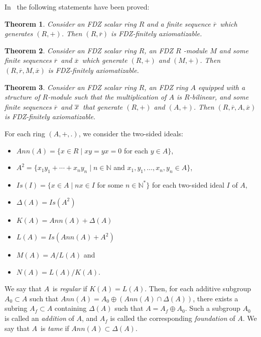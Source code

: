 \documentclass{article}
\newtheorem{theorem}{Theorem}[section]
\theoremstyle{remark}
\begin{document}
In~\cite{MOS} the following statements have been proved:

\begin{theorem}\label{MOS-1} Consider an FDZ scalar ring $R$ and a finite
sequence $\overline{r}$\ which generates $(R,+)$. Then $(R,\overline{r})$ is
FDZ-finitely axiomatizable.\end{theorem}

\begin{theorem} \label{MOS-2} Consider an FDZ scalar ring $R$, an FDZ $R$%
-module $M$ and some finite sequences $\overline{r}$\ and $\overline{x}$\
which generate $(R,+)$ and $(M,+)$. Then $(R,\overline{r},M,\overline{x})$
is FDZ-finitely axiomatizable.\end{theorem}

\begin{theorem} \label{MOS-3} Consider an FDZ scalar ring $R$, an FDZ ring 
$A$ equipped with a structure of $R$-module such that the multiplication of $%
A$ is $R$-bilinear, and some finite sequences $\overline{r}$\ and $\overline{%
x}$\ that generate $(R,+)$ and $(A,+)$. Then $(R,\overline{r},A,\overline{x}%
)$ is FDZ-finitely axiomatizable.\end{theorem}

For each ring $(A,+,.)$, we consider the two-sided ideals:
\begin{itemize}
\item $Ann(A)=\{x\in R\mid xy=yx=0$ for each $y\in A\}$,

\item $A^{2}=\{x_{1}y_{1}+\cdots +x_{n}y_{n}\mid n\in 
\mathbb{N}
$ and $x_{1},y_{1},\ldots ,x_{n},y_{n}\in A\}$,
\item $Is(I)=\{x\in A\mid nx\in I$ for some $n\in 
\mathbb{N}
^{\ast }\}$ for each two-sided ideal $I$ of $A$,
\item $\Delta(A)=Is(A^2)$
\item$K(A)=Ann(A)+\Delta(A)$ 
\item $L(A)=Is(Ann(A)+A^{2})$
\item $M(A)=A/L(A)$ and 
\item $N(A)=L(A)/K(A)$.
\end{itemize}
We say that $A$\ is \emph{regular} if $K(A)=L(A)$. Then, for each additive subgroup $A_0\subset
A $ such that $Ann(A)=A_0\oplus (Ann(A)\cap \Delta(A))$, there exists a subring $A_f
\subset A $ containing $\Delta(A)$ such that $A=A_f\oplus A_0$. Such a subgroup $A_0$ is called an \emph{addition} of $A$, and $A_f$ is called the corresponding \emph{foundation} of $A$. We say that $A$\ is \emph{tame} if $Ann(A)\subset \Delta(A)$.
\end{document}
